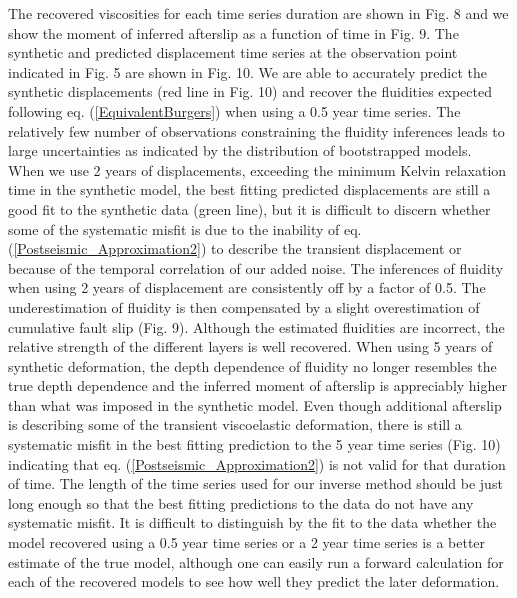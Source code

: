The recovered viscosities for each time series duration are shown in
Fig. 8 and we show the moment of inferred afterslip as a function of
time in Fig. 9. The synthetic and predicted displacement time series
at the observation point indicated in Fig. 5 are shown in Fig. 10.  We
are able to accurately predict the synthetic displacements (red line
in Fig. 10) and recover the fluidities expected following
eq. (\ref{EquivalentBurgers}) when using a 0.5 year time series. The
relatively few number of observations constraining the fluidity
inferences leads to large uncertainties as indicated by the
distribution of bootstrapped models.  When we use 2 years of
displacements, exceeding the minimum Kelvin relaxation time in the
synthetic model, the best fitting predicted displacements are still a
good fit to the synthetic data (green line), but it is difficult to
discern whether some of the systematic misfit is due to the inability
of eq. (\ref{Postseismic_Approximation2}) to describe the transient
displacement or because of the temporal correlation of our added
noise.  The inferences of fluidity when using 2 years of displacement
are consistently off by a factor of 0.5.  The underestimation of
fluidity is then compensated by a slight overestimation of cumulative
fault slip (Fig. 9). Although the estimated fluidities are incorrect,
the relative strength of the different layers is well recovered.  When
using 5 years of synthetic deformation, the depth dependence of
fluidity no longer resembles the true depth dependence and the
inferred moment of afterslip is appreciably higher than what was
imposed in the synthetic model. Even though additional afterslip is
describing some of the transient viscoelastic deformation, there is
still a systematic misfit in the best fitting prediction to the 5 year
time series (Fig. 10) indicating that
eq. (\ref{Postseismic_Approximation2}) is not valid for that duration
of time.  The length of the time series used for our inverse method
should be just long enough so that the best fitting predictions to the
data do not have any systematic misfit.  It is difficult to
distinguish by the fit to the data whether the model recovered using a
0.5 year time series or a 2 year time series is a better estimate of
the true model, although one can easily run a forward calculation for
each of the recovered models to see how well they predict the later
deformation.

